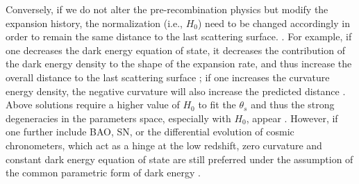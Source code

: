 \documentclass[useAMS,usenatbib]{mnras}
\def\planck{\textit{planck}}
\def\kms {\rm km\,s^{-1}}
\begin{document}
Conversely, if we do not alter the pre-recombination physics but modify the expansion history, the normalization (i.e., $H_{0}$) need to be changed accordingly in order to remain the same distance to the last scattering surface. \citep{RiessEtal16,Freedman17}.
For example, if one decreases the dark energy equation of state, it decreases the contribution of the dark energy density to the shape of the expansion rate, and thus increase the overall distance to the last scattering surface \citep[e.g.,][]{Linder04}; if one increases the curvature energy density, the negative curvature will also increase the predicted distance \citep[e.g.,][]{EfstathiouEtal03}. 
Above solutions require a higher value of $H_{0}$ to fit the $\theta_{s}$ and thus the strong degeneracies in the parameters space, especially with $H_{0}$, appear \citep{planck18parameter}. However, if one further include BAO, SN, or the differential evolution of cosmic chronometers, which act as a hinge at the low redshift, zero curvature and constant dark energy equation of state are still preferred \citep[e.g.,][]{MorescoEtal16,AlamEtal17} under the assumption of the common parametric form of dark energy \citep{Linder03}.
\end{document}

